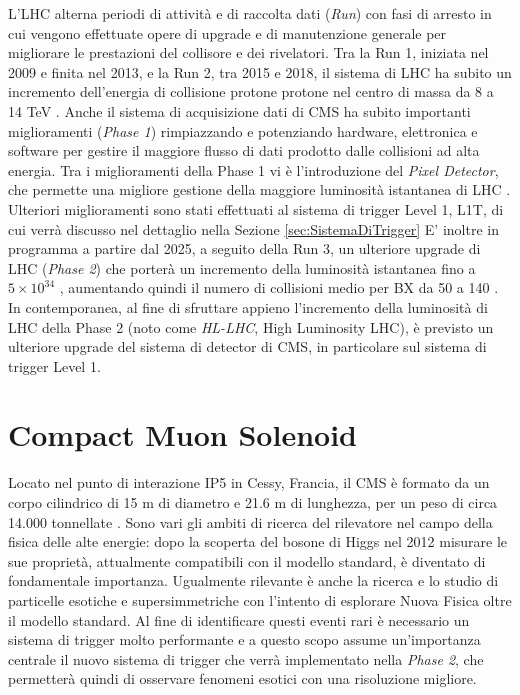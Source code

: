 L'LHC alterna periodi di attività e di raccolta dati (\textit{Run}) con fasi di arresto in cui vengono effettuate opere di upgrade e di manutenzione generale per migliorare le prestazioni del collisore e dei rivelatori. Tra la Run 1, iniziata nel 2009 e finita nel 2013, e la Run 2, tra 2015 e 2018, il sistema di LHC ha subito un incremento dell'energia di collisione protone protone nel centro di massa da 8 a 14 TeV \cite{sirunyan2020performance}. Anche il sistema di acquisizione dati di CMS ha subito importanti miglioramenti (\textit{Phase 1}) rimpiazzando e potenziando hardware, elettronica e software per gestire il maggiore flusso di dati prodotto dalle collisioni ad alta energia. Tra i miglioramenti della Phase 1 vi è l'introduzione del \textit{Pixel Detector}, che permette una migliore gestione della maggiore luminosità istantanea di LHC \cite{Adam:2748381}. Ulteriori miglioramenti sono stati effettuati al sistema di trigger Level 1, L1T, di cui verrà discusso nel dettaglio nella Sezione \ref{sec:SistemaDiTrigger} \newline 
E' inoltre in programma a partire dal 2025, a seguito della Run 3, un ulteriore upgrade di LHC (\textit{Phase 2}) che porterà un incremento della luminosità istantanea fino a $5\times 10^{34}$ \Lumi, aumentando quindi il numero di collisioni medio per BX da 50 a 140 \cite{collaboration2021phase}. In contemporanea, al fine di sfruttare appieno l'incremento della luminosità di LHC della Phase 2 (noto come \textit{HL-LHC}, High Luminosity LHC), è previsto un ulteriore upgrade del sistema di detector di CMS, in particolare sul sistema di trigger Level 1.


\section{Compact Muon Solenoid}  
\label{sec:CMSDescrizione}

Locato nel punto di interazione IP5 in Cessy, Francia, il CMS è formato da un corpo cilindrico di 15 m di diametro e 21.6 m di lunghezza, per un peso di circa 14.000 tonnellate \cite{cms2008cms}. Sono vari gli ambiti di ricerca del rilevatore nel campo della fisica delle alte energie: dopo la scoperta del bosone di Higgs nel 2012 misurare le sue proprietà, attualmente compatibili con il modello standard, è diventato di fondamentale importanza. Ugualmente rilevante è anche la ricerca e lo studio di particelle esotiche e supersimmetriche con l'intento di esplorare Nuova Fisica oltre il modello standard. Al fine di identificare questi eventi rari è necessario un sistema di trigger molto performante \cite{sirunyan2020performance} e a questo scopo assume un'importanza centrale il nuovo sistema di trigger che verrà implementato nella \textit{Phase 2}, che permetterà quindi di osservare fenomeni esotici con una risoluzione migliore.

